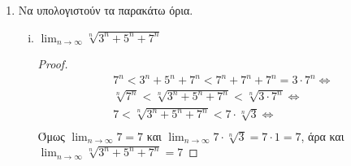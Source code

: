 \begin{enumerate}
\begin{enumerate}[i)]
        \item $ \lim_{n \to \infty} \left(\frac{n^{2}-1}{n^{2}+1} \right)^{n^{2}} $
          \begin{proof}
            \begin{align*}
              a_{n} = \left(\frac{n^{2}-1}{n^{2}+1}\right)^{n^{2}} = 
              \left(\frac{n^{2}\left(1- 
                    \frac{1}{n^{2}}\right)}{n^{2}\left(1+ 
              \frac{1}{n^{2}}\right)}\right)^{n^{2}} = 
              \frac{\left(1 - \frac{1}{n^{2}}\right)^{n^{2}}}
              {\left(1 + \frac{1}{n^{2}} \right)^{n^{2}}} 
              \xrightarrow{n \to \infty}  
              \frac{\frac{1}{e}}{e} = \frac{1}{e^{2}} 
            \end{align*} 
          \end{proof}
      \end{enumerate}

    \item Να υπολογιστούν τα παρακάτω όρια.

      \begin{enumerate}[i)]
        \item $ \lim_{n \to \infty} \sqrt[n]{3^{n} + 5^{n}+7^{n}} $ 
          \begin{proof}
            \begin{gather*}
              7^{n} < 3^{n}+5^{n}+7^{n} < 7^{n}+7^{n}+7^{n} = 3\cdot 7^{n} 
              \Leftrightarrow \\
              \sqrt[n]{7^{n}} < \sqrt[n]{3^{n}+5^{n}+7^{n}} < 
              \sqrt[n]{3 \cdot 7^{n}} \Leftrightarrow \\
              7 < \sqrt[n]{3^{n}+5^{n}+7^{n}} < 7\cdot \sqrt[n]{3} 
              \Leftrightarrow \\
            \end{gather*}
            Όμως $ \lim_{n \to \infty} 7 = 7 $ και $ \lim_{n \to \infty} 7 
            \cdot \sqrt[n]{3} = 7 \cdot 1 = 7$, άρα και $ 
            \lim_{n \to \infty} \sqrt[n]{3^{n}+5^{n}+7^{n}} = 7$
          \end{proof}


\end{enumerate}
\end{enumerate}
